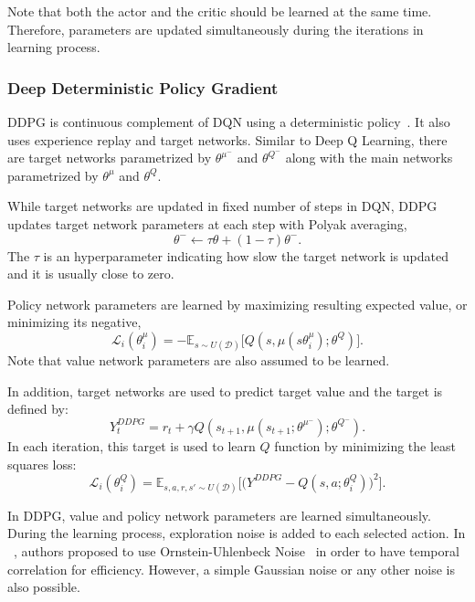 Note that both the actor and the critic should be learned at the same time. Therefore, parameters are updated simultaneously during the iterations in learning process. 

\subsubsection{Deep Deterministic Policy Gradient}
DDPG is continuous complement of DQN using a deterministic policy~\cite{lillicrap_continuous_2019}. 
It also uses experience replay and target networks. 
Similar to Deep Q Learning, there are target networks parametrized by $\theta^{\mu^-}$ and $\theta^{Q^-}$ 
along with the main networks parametrized by $\theta^{\mu}$ and $\theta^{Q}$. 

While target networks are updated in fixed number of steps in DQN, 
DDPG updates target network parameters at each step with Polyak averaging, 
\begin{equation}
\label{eqn:target_update}
\theta^- \leftarrow \tau \theta + (1-\tau) \theta^- .
\end{equation}
The $\tau$ is an hyperparameter indicating how slow the target network is updated and it is usually close to zero. 

Policy network parameters are learned by maximizing resulting expected value, or minimizing its negative,
\begin{equation}
\label{eqn:ddpg_policy_loss}
\mathcal{L}_i(\theta^\mu_i) = -\mathbb{E}_{s \sim U(\mathcal{D})} \Big[ Q(s, \mu(s\theta^\mu_i);\theta^Q) \Big].
\end{equation} 
Note that value network parameters are also assumed to be learned. 

In addition, target networks are used to predict target value and the target is defined by: 
\begin{equation}
\label{eqn:ddpg_target}
Y_t^{DDPG} = r_t + \gamma Q(s_{t+1}, \mu(s_{t+1};\theta^{\mu^-});\theta^{Q^-}).
\end{equation}
In each iteration, this target is used to learn $Q$ function by minimizing the least squares loss: 
\begin{equation}
\label{eqn:ddpg_loss}
\mathcal{L}_i(\theta^Q_i) = \mathbb{E}_{s,a,r,s'\sim U(\mathcal{D})}\Big[\big( Y^{DDPG} - Q(s,a;\theta^Q_i) \big) ^ 2 \Big].
\end{equation}

In DDPG, value and policy network parameters are learned simultaneously. 
During the learning process, exploration noise is added to each selected action. 
In ~\cite{lillicrap_continuous_2019}, authors proposed to use Ornstein-Uhlenbeck Noise~\cite{uhlenbeck_theory_1930} in order to have temporal correlation for efficiency. 
However, a simple Gaussian noise or any other noise is also possible. 

